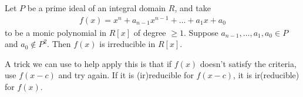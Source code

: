 \documentclass{memoir}
\begin{document}
\begin{thm}
	Let \(P\) be a prime ideal of an integral domain \(R\), and take
	\begin{align*}
		f(x) = x^{n}+ a_{n-1}x^{n-1}+ \ldots + a_1x + a_0
	\end{align*}
	to be a monic polynomial in \(R[x]\) of degree \(\geq 1\). Suppose \(a_{n-1},\ldots,a_1,a_0 \in P\) and \(a_0 \not\in P^2\). Then \(f(x) \) is irreducible in \(R[x]\).
\end{thm}
A trick we can use to help apply this is that if \(f(x)\) doesn't satisfy the criteria, use \(f(x-c)\) and try again. If it is (ir)reducible for \(f(x-c)\), it is ir(reducible) for \(f(x)\).
\end{document}

